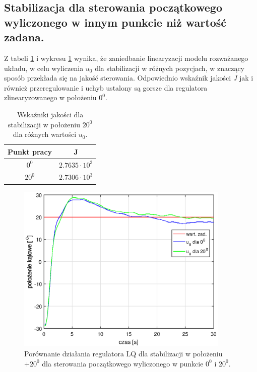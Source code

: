 \documentclass[11pt,a4paper]{article}
\begin{document}
\subsection{Stabilizacja dla sterowania początkowego wyliczonego w innym punkcie niż wartość zadana.}
Z tabeli \ref{por_reg_LQ_u0} i wykresu \ref{fig:por_LQ9_u} wynika, że zaniedbanie linearyzacji modelu rozważanego układu, w celu wyliczenia $u_0$ dla stabilizacji w różnych pozycjach, w znaczący sposób przekłada się na jakość sterowania. Odpowiednio wska\'znik jakości \textit{J} jak i również przeregulowanie i uchyb ustalony są gorsze dla regulatora zlinearyzowanego w położeniu $0^0$. 
\begin{table}[h]
	\caption{Wska\'zniki jakości dla stabilizacji w położeniu $20^0$ dla różnych wartości $u_0$.}
	\label{por_reg_LQ_u0}
	\centering
	
	\begin{tabular}{|c|c|}
		\hline
		Punkt pracy &J\\
		\hline
		$0^0$ & $2.7635 \cdot 10 ^3$\\
		\hline
		$20^0$ & $2.7306 \cdot 10 ^3$\\
		\hline
	\end{tabular}
\end{table}

\begin{figure}[H]
	\centering
	\includegraphics[width=4in]{Figures/porLQ9_u.eps}
	\caption{Porównanie działania regulatora LQ dla stabilizacji w położeniu $+20 ^0$ dla sterowania początkowego wyliczonego w punkcie $0^0$ i $20^0$.}
	\label{fig:por_LQ9_u}
\end{figure}

%
\end{document}
